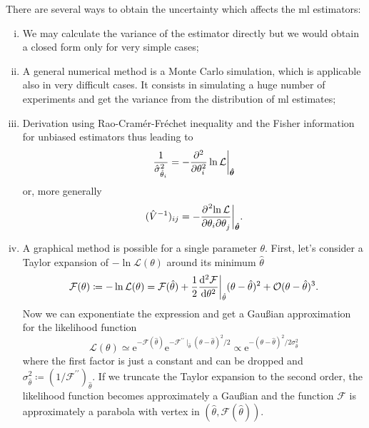 \documentclass[
	10pt,
	draft
]{scrreprt}
\newcommand{\lkhd}{\ensuremath{\mathcal{L}}}
\newcommand{\eu}{\ensuremath{\mathrm{e}}}
\newcommand{\deriv}[3][]{\dfrac{\ud^{#1}#2}{\ud #3^{#1}}}%
\newcommand{\pderiv}[3][]{\dfrac{{\de^{#1}}#2}{\de #3^{#1}}}%
\begin{document}
There are several ways to obtain the uncertainty which affects the \ac{ml} estimators:
\begin{enumerate}[i.]
	\item
We may calculate the variance of the estimator directly but we would obtain a closed form only for very simple cases;
	\item
A general numerical method is a Monte Carlo simulation, which is applicable also in very difficult cases.
It consists in simulating a huge number of experiments and get the variance from the distribution of \ac{ml} estimates;
	\item
Derivation using Rao-Cramér-Fréchet inequality and the Fisher information for unbiased estimators \vec{\hat\theta} thus leading to
\begin{equation}
\frac{1}{\hat{\sigma}^2_{\hat{\theta}_i}} = -\pderiv[2]{}{\theta_i}\ln\lkhd\bigg\rvert_{\vec{\hat\theta}}
\end{equation}
or, more generally
\begin{equation}
(\hat V^{-1})_{ij} = - \pderiv{^2\!\ln\lkhd}{\theta_i\!\de\theta_j}\bigg\rvert_{\vec{\hat\theta}}.
\end{equation}
	\item
A graphical method is possible for a single parameter $\theta$.
First, let's consider a Taylor expansion of $-\ln\lkhd(\theta)$ around its minimum $\hat\theta$
\begin{equation}
\mathcal{F}(\theta) \coloneqq -\ln \lkhd(\theta)
= \mathcal{F}(\hat\theta) + \frac{1}{2}\deriv[2]{\mathcal{F}}{\theta}\bigg\rvert_{\hat\theta}(\theta-\hat\theta)^2 
+ \mathcal{O}(\theta-\hat\theta)^3.
\end{equation}
Now we can exponentiate the expression and get a Gau\ss{}ian approximation for the likelihood function
\begin{equation}\label{eq:GaussLikApprox}
\lkhd(\theta) \simeq \eu^{-\mathcal{F}(\hat\theta)}\eu^{-\mathcal{F}^{\prime\prime}\mid_{\hat\theta} (\theta-\hat\theta)^2\!/2}
\propto \eu^{-(\theta-\hat\theta)^2\!/2\sigma_{\hat\theta}^2}
\end{equation}
where the first factor is just a constant and can be dropped and $\sigma^2_{\hat\theta}\coloneqq (1/\mathcal{F}^{\prime\prime})_{\hat\theta}$.
If we truncate the Taylor expansion to the second order, the likelihood function becomes approximately a Gau\ss{}ian and the function $\mathcal{F}$ is approximately a parabola with vertex in $(\hat\theta,\mathcal{F}(\hat\theta))$.



\end{enumerate}
\end{document}
